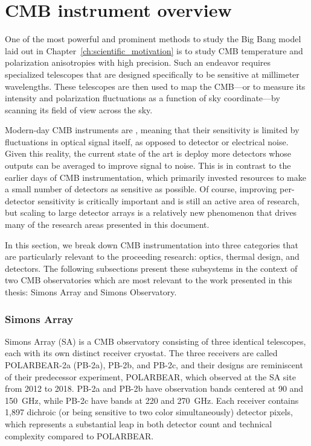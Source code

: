 \chapter{CMB instrument overview}
\label{ch:cmb_instrument_overview}

One of the most powerful and prominent methods to study the Big Bang model laid out in Chapter~\ref{ch:scientific_motivation} is to study CMB temperature and polarization anisotropies with high precision. Such an endeavor requires specialized telescopes that are designed specifically to be sensitive at millimeter wavelengths. These telescopes are then used to map the CMB---or to measure its intensity and polarization fluctuations as a function of sky coordinate---by scanning its field of view across the sky.

Modern-day CMB instruments are , meaning that their sensitivity is limited by fluctuations in optical signal itself, as opposed to detector or electrical noise. Given this reality, the current state of the art is deploy more detectors whose outputs can be averaged to improve signal to noise. This is in contrast to the earlier days of CMB instrumentation, which primarily invested resources to make a small number of detectors as sensitive as possible. Of course, improving per-detector sensitivity is critically important and is still an active area of research, but scaling to large detector arrays is a relatively new phenomenon that drives many of the research areas presented in this document.

In this section, we break down CMB instrumentation into three categories that are particularly relevant to the proceeding research: optics, thermal design, and detectors. The following subsections present these subsystems in the context of two CMB observatories which are most relevant to the work presented in this thesis: Simons Array and Simons Observatory.


\subsection{Simons Array}
\label{sec:simons_array_description}

Simons Array (SA) is a CMB observatory consisting of three identical telescopes, each with its own distinct receiver cryostat. The three receivers are called POLARBEAR-2a (PB-2a), PB-2b, and PB-2c, and their designs are reminiscent of their predecessor experiment, POLARBEAR, which observed at the SA site from 2012 to 2018. PB-2a and PB-2b have observation bands centered at 90 and 150~GHz, while PB-2c have bands at 220 and 270~GHz. Each receiver contains 1,897 dichroic (or being sensitive to two color simultaneously) detector pixels, which represents a substantial leap in both detector count and technical complexity compared to POLARBEAR.

